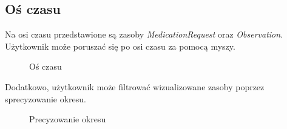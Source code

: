 \documentclass[a4paper]{article}
\begin{document}
\subsection{Oś czasu}
Na osi czasu przedstawione są zasoby \textit{MedicationRequest} oraz \textit{Observation}.
Użytkownik może poruszać się po osi czasu za pomocą myszy.
\begin{figure}[H]
    \caption{Oś czasu}
\end{figure}

Dodatkowo, użytkownik może filtrować wizualizowane zasoby poprzez sprecyzowanie okresu.
\begin{figure}[H]
    \caption{Precyzowanie okresu}
\end{figure}

\pagebreak
\end{document}
